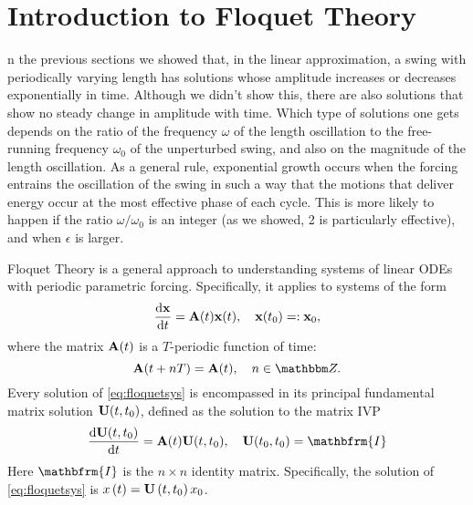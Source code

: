 \documentclass[10pt,letter, swedish, english,%
]{article}
\newcommand{\I}{{\mathbfrm{I}}}
\begin{document}





\section{Introduction to Floquet Theory}
n the previous sections we showed that, in the linear approximation, a
swing with periodically varying length has solutions whose amplitude
increases or decreases exponentially in time. Although we didn’t show
this, there are also solutions that show no steady change in amplitude
with time. Which type of solutions one gets depends on the ratio of
the frequency $\omega$ of the length oscillation to the free-running
frequency $\omega_0$ of the unperturbed swing, and also on the magnitude  of the
length oscillation. As a general rule, exponential growth occurs when
the forcing entrains the oscillation of the swing in such a way that
the motions that deliver energy occur at the most effective phase of
each cycle. This is more likely to happen if the ratio $\omega/\omega_0$ is an integer
(as we showed, 2 is particularly effective), and when $\epsilon$ is larger.  

Floquet Theory is a general approach to understanding systems of
linear ODEs with periodic parametric forcing. Specifically, it applies
to systems of the form 
\begin{equation}\label{eq:floquetsys}%
\dv{\vb{x}}{t}=\vb{A}(t)\vb{x}(t)
\qcomma \vb{x}(t_0)=:\vb{x}_0,
\end{equation}
where the matrix $\vb{A}(t)$ is a $T$-periodic function of time: 
\begin{equation}\label{eq:2}
\vb{A}(t+nT)=\vb{A}(t)\qcomma
n\in\Z.
\end{equation}
Every solution of \eqref{eq:floquetsys} is encompassed in its principal
fundamental matrix solution $\vb{U}(t,t_0)$, defined as the solution
to the matrix IVP  
\begin{equation}
\dv{\vb{U}(t,t_0)}{t}=\vb{A}(t)\vb{U}(t,t_0)\qcomma
\vb{U}(t_0,t_0)=\I
\end{equation}
Here  $\I$ is the  $n\times n$ identity matrix. Specifically, the
solution of \eqref{eq:floquetsys} is  $x\left(t\right)=\vb{U}\left(t,{t}_{0}\right){x}_{0}$.
\end{document}
